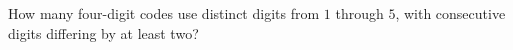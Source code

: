 How many four-digit codes use distinct digits from $1$ through $5$, with consecutive digits differing by at least two?
